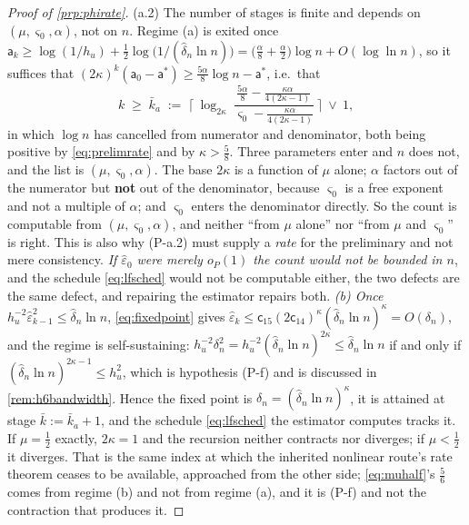 \begin{proof}[Proof of \cref{prp:phirate}]
(a.2) The number of stages is finite and depends on $(\mu,\varsigma_0,\alpha)$, not on $n$.
Regime (a) is exited once
$\mathsf a_k\ge\log(1/h_u)+\tfrac12\log\big(1/(\hat\delta_n\ln n)\big)=\big(\tfrac{\alpha}{8}+\tfrac{\alpha}{2}\big)\log n+O(\log\ln n)$,
so it suffices that $(2\kappa)^{k}(\mathsf a_0-\mathsf a^{\ast})\ge\tfrac{5\alpha}{8}\log n-\mathsf a^{\ast}$,
i.e.\ that
\[
k\;\ge\;\bar k_a\;:=\;\Big\lceil\ \log_{2\kappa}\
\frac{\tfrac{5\alpha}{8}-\tfrac{\kappa\alpha}{4(2\kappa-1)}}
     {\varsigma_0-\tfrac{\kappa\alpha}{4(2\kappa-1)}}\ \Big\rceil\ \vee\ 1 ,
\]
in which $\log n$ has cancelled from numerator and denominator, both being positive by
\eqref{eq:prelimrate} and by $\kappa>\tfrac58$. Three parameters enter and $n$ does not, and the
list is $(\mu,\varsigma_0,\alpha)$. The base $2\kappa$ is a function of $\mu$ alone; $\alpha$ factors
out of the numerator but \textbf{not} out of the denominator, because $\varsigma_0$ is a free exponent
and not a multiple of $\alpha$; and $\varsigma_0$ enters the denominator directly. So the count
is computable from $(\mu,\varsigma_0,\alpha)$, and neither ``from $\mu$ alone'' nor ``from $\mu$ and
$\varsigma_0$'' is right. This is also why (P-a.2) must supply a \emph{rate} for the
preliminary and not mere consistency. \emph{If
$\hat\varepsilon_0$ were merely $o_P(1)$ the count would not be bounded in $n$}, and the schedule
\eqref{eq:lfsched} would not be computable either, the two defects are the same defect, and
repairing the estimator repairs both.
\emph{(b) Once $h_u^{-2}\hat\varepsilon_{k-1}^{2}\le\hat\delta_n\ln n$}, \eqref{eq:fixedpoint}
gives $\hat\varepsilon_k\le\mathsf c_{15}(2\mathsf c_{14})^{\kappa}(\hat\delta_n\ln n)^{\kappa}=O(\delta_n)$, and the
regime is self-sustaining: $h_u^{-2}\delta_n^{2}=h_u^{-2}(\hat\delta_n\ln n)^{2\kappa}\le\hat\delta_n\ln n$
if and only if $(\hat\delta_n\ln n)^{2\kappa-1}\le h_u^{2}$, which is hypothesis (P-f) and is discussed
in \cref{rem:h6bandwidth}. Hence the fixed point is $\delta_n=(\hat\delta_n\ln n)^{\kappa}$, it is
attained at stage $\bar k:=\bar k_a+1$, and the schedule \eqref{eq:lfsched} the estimator computes
tracks it.
If $\mu=\tfrac12$ exactly, $2\kappa=1$ and the recursion neither contracts nor diverges; if
$\mu<\tfrac12$ it diverges. That is the same index at which the inherited nonlinear route's rate
theorem ceases to be available, approached from the other side; \eqref{eq:muhalf}'s $\tfrac56$ comes
from regime (b) and not from regime (a), and it is (P-f) and not the contraction that produces it.


\end{proof}
